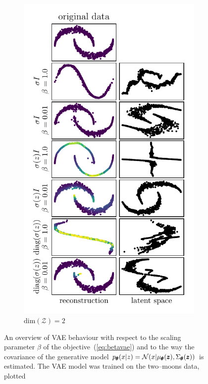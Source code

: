 \begin{figure}
\begin{subfigure}[b]{0.45\textwidth}
        \includegraphics[scale=0.9]{data/chapter_survey/vae_two_moons_z2_colored}
        \caption{$\text{dim}(\mathcal{Z})=2$}
    \end{subfigure}
\caption{An overview of VAE behaviour with respect to the scaling parameter
$\beta$ of the objective~(\ref{eq:betavae}) and to the way the
covariance of the generative model $p_{\pmb{{\theta}}}(x|z)=\mathcal{N}(x|\mu_{\pmb{{\theta}}}(\pmb{{z}}),\Sigma_{\pmb{{\theta}}}(\pmb{{z}}))$
is estimated. The VAE model was trained on the two--moons data, plotted
}
\end{figure}
